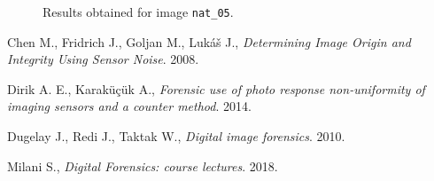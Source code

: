 \documentclass[a4paper, 12pt]{article}
\begin{document}
\begin{figure}[H]
	\centering
	\caption{Results obtained for image \texttt{nat\_05}.}
	\label{fig:differentquality}
\end{figure}

\begin{thebibliography}{3}
	Chen M., Fridrich J., Goljan M., Lukáš J.,
	\textit{Determining Image Origin and Integrity Using Sensor Noise}.
	2008.
	
	Dirik A. E., Karaküçük A.,
	\textit{Forensic use of photo response non-uniformity of imaging sensors and a counter method}.
	2014.
		
	Dugelay J., Redi J., Taktak W.,
	\textit{Digital image forensics}.
	2010.
	
	Milani S.,
	\textit{Digital Forensics: course lectures}.
	2018.
\end{thebibliography}
\end{document}

